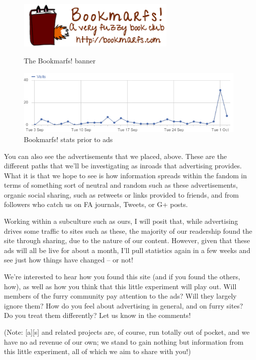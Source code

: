 \begin{figure}
  \begin{center}
    \includegraphics[width=3in]{content/assets/ads--bookmarfs-ad}
  \end{center}
  \caption{The Bookmarfs! banner}
  \begin{center}
    \includegraphics[width=\textwidth]{content/assets/ads--bookmarfs-preads}
  \end{center}
  \caption{Bookmarfs! stats prior to ads}
\end{figure}

You can also see the advertisements that we placed, above. These are the different paths that we'll be investigating as inroads that advertising provides. What it is that we hope to see is how information spreads within the fandom in terms of something sort of neutral and random such as these advertisements, organic social sharing, such as retweets or links provided to friends, and from followers who catch us on FA journals, Tweets, or G+ posts.

Working within a subculture such as ours, I will posit that, while advertising drives some traffic to sites such as these, the majority of our readership found the site through sharing, due to the nature of our content. However, given that these ads will all be live for about a month, I'll pull statistics again in a few weeks and see just how things have changed -- or not!

We're interested to hear how you found this site (and if you found the others, how), as well as how you think that this little experiment will play out. Will members of the furry community pay attention to the ads? Will they largely ignore them? How do you feel about advertising in general, and on furry sites? Do you treat them differently? Let us know in the comments!

(Note: [a][s] and related projects are, of course, run totally out of pocket, and we have no ad revenue of our own; we stand to gain nothing but information from this little experiment, all of which we aim to share with you!)
